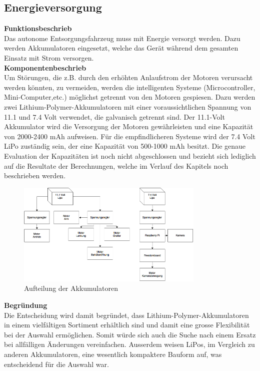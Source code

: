 \subsection{Energieversorgung}
%
\textbf{Funktionsbeschrieb}\\[0.2cm]
Das autonome Entsorgungsfahrzeug muss mit Energie versorgt werden. Dazu werden Akkumulatoren eingesetzt, welche das Gerät während dem gesamten Einsatz mit Strom versorgen. 
\\[0.2cm]
\textbf{Komponentenbeschrieb}\\[0.2cm]
Um Störungen, die z.B. durch den erhöhten Anlaufstrom der Motoren verursacht werden könnten, zu vermeiden, werden die intelligenten Systeme (Microcontroller, Mini-Computer,etc.) möglichst getrennt von den Motoren gespiesen. Dazu werden zwei Lithium-Polymer-Akkumulatoren mit einer voraussichtlichen Spannung von 11.1 und 7.4 Volt verwendet, die galvanisch getrennt sind.
Der 11.1-Volt Akkumulator wird die Versorgung der Motoren gewährleisten und eine Kapazität von 2000-2400 mAh aufweisen. Für die empfindlicheren Systeme wird der 7.4 Volt LiPo zuständig sein, der eine Kapazität von 500-1000 mAh besitzt.
Die genaue Evaluation der Kapazitäten ist noch nicht abgeschlossen und bezieht sich lediglich auf die Resultate der Berechnungen, welche im Verlauf des Kapitels noch beschrieben werden.
\begin{figure}[H]
\centering
\includegraphics[width=0.8\textwidth]{03_Loesungskonzept/pictures/speisung.png}
\caption{Aufteilung der Akkumulatoren}	
\end{figure}
\textbf{Begründung}\\[0.2cm]
Die Entscheidung wird damit begründet, dass Lithium-Polymer-Akkumulatoren in einem vielfältigen Sortiment erhältlich sind und damit eine grosse Flexibilität bei der Auswahl ermöglichen. Somit würde sich auch die Suche nach einem Ersatz bei allfälligen Änderungen vereinfachen. Ausserdem weisen LiPos, im Vergleich zu anderen Akkumulatoren, eine wesentlich kompaktere Bauform auf, was entscheidend für die Auswahl war. \\[0.2cm]
